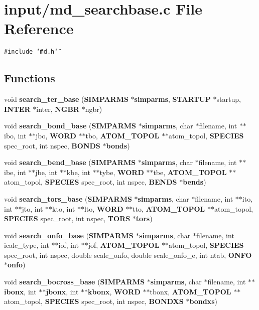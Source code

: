 \section{input/md\_\-searchbase.c File Reference}
\label{input_2md__searchbase_8c}
{\tt \#include \char`\"{}md.h\char`\"{}}\par
\subsection*{Functions}
\begin{CompactItemize}
\item 
void {\bf search\_\-ter\_\-base} ({\bf SIMPARMS} $\ast${\bf simparms}, {\bf STARTUP} $\ast$startup, {\bf INTER} $\ast$inter, {\bf NGBR} $\ast$ngbr)
\item 
void {\bf search\_\-bond\_\-base} ({\bf SIMPARMS} $\ast${\bf simparms}, char $\ast$filename, int $\ast$$\ast$ibo, int $\ast$$\ast$jbo, {\bf WORD} $\ast$$\ast$tbo, {\bf ATOM\_\-TOPOL} $\ast$$\ast$atom\_\-topol, {\bf SPECIES} spec\_\-root, int nspec, {\bf BONDS} $\ast${\bf bonds})
\item 
void {\bf search\_\-bend\_\-base} ({\bf SIMPARMS} $\ast${\bf simparms}, char $\ast$filename, int $\ast$$\ast$ibe, int $\ast$$\ast$jbe, int $\ast$$\ast$kbe, int $\ast$$\ast$tybe, {\bf WORD} $\ast$$\ast$tbe, {\bf ATOM\_\-TOPOL} $\ast$$\ast$atom\_\-topol, {\bf SPECIES} spec\_\-root, int nspec, {\bf BENDS} $\ast${\bf bends})
\item 
void {\bf search\_\-tors\_\-base} ({\bf SIMPARMS} $\ast${\bf simparms}, char $\ast$filename, int $\ast$$\ast$ito, int $\ast$$\ast$jto, int $\ast$$\ast$kto, int $\ast$$\ast$lto, {\bf WORD} $\ast$$\ast$tto, {\bf ATOM\_\-TOPOL} $\ast$$\ast$atom\_\-topol, {\bf SPECIES} spec\_\-root, int nspec, {\bf TORS} $\ast${\bf tors})
\item 
void {\bf search\_\-onfo\_\-base} ({\bf SIMPARMS} $\ast${\bf simparms}, char $\ast$filename, int icalc\_\-type, int $\ast$$\ast$iof, int $\ast$$\ast$jof, {\bf ATOM\_\-TOPOL} $\ast$$\ast$atom\_\-topol, {\bf SPECIES} spec\_\-root, int nspec, double scale\_\-onfo, double scale\_\-onfo\_\-e, int ntab, {\bf ONFO} $\ast${\bf onfo})
\item 
void {\bf search\_\-bocross\_\-base} ({\bf SIMPARMS} $\ast${\bf simparms}, char $\ast$filename, int $\ast$$\ast${\bf ibonx}, int $\ast$$\ast${\bf jbonx}, int $\ast$$\ast${\bf kbonx}, {\bf WORD} $\ast$$\ast$tbonx, {\bf ATOM\_\-TOPOL} $\ast$$\ast$atom\_\-topol, {\bf SPECIES} spec\_\-root, int nspec, {\bf BONDXS} $\ast${\bf bondxs})
\end{CompactItemize}


